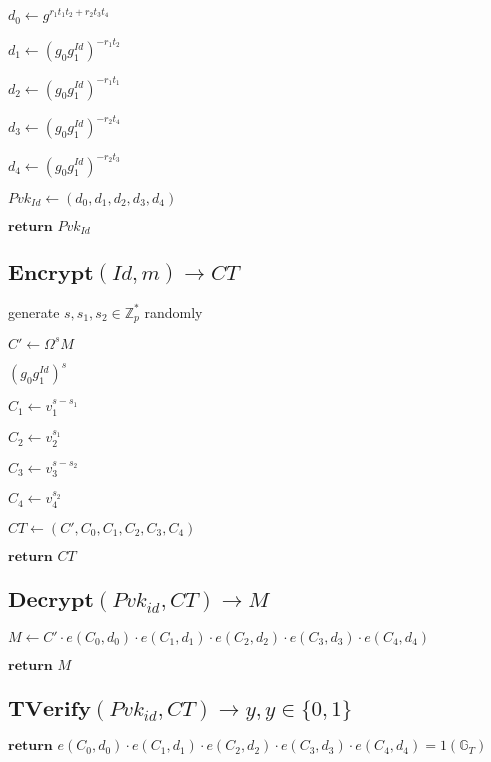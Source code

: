 \documentclass[a4paper]{article}
\begin{document}
$d_0 \gets g^{r_1 t_1 t_2 + r_2 t_3 t_4}$

$d_1 \gets (g_0 g_1^\textit{Id})^{-  r_1 t_2}$

$d_2 \gets (g_0 g_1^\textit{Id})^{-  r_1 t_1}$

$d_3 \gets (g_0 g_1^\textit{Id})^{-  r_2 t_4}$

$d_4 \gets (g_0 g_1^\textit{Id})^{-  r_2 t_3}$

$\textit{Pvk}_\textit{Id} \gets (d_0, d_1, d_2, d_3, d_4)$

$\textbf{return }\textit{Pvk}_\textit{Id}$

\subsection{$\textbf{Encrypt}(\textit{Id}, m) \rightarrow \textit{CT}$}

generate $s, s_1, s_2 \in \mathbb{Z}_p^*$ randomly

$C' \gets \Omega^s M$

$(g_0 g_1^\textit{Id})^s$

$C_1 \gets v_1^{s - s_1}$

$C_2 \gets v_2^{s_1}$

$C_3 \gets v_3^{s - s_2}$

$C_4 \gets v_4^{s_2}$

$\textit{CT} \gets (C', C_0, C_1, C_2, C_3, C_4)$

$\textbf{return }\textit{CT}$

\subsection{$\textbf{Decrypt}(\textit{Pvk}_\textit{id}, \textit{CT}) \rightarrow M$}

$M \gets C' \cdot e(C_0, d_0) \cdot e(C_1, d_1) \cdot e(C_2, d_2) \cdot e(C_3, d_3) \cdot e(C_4, d_4)$

$\textbf{return }M$

\subsection{$\textbf{TVerify}(\textit{Pvk}_\textit{id}, \textit{CT}) \rightarrow y, y \in \{0, 1\}$}

$\textbf{return }e(C_0, d_0) \cdot e(C_1, d_1) \cdot e(C_2, d_2) \cdot e(C_3, d_3) \cdot e(C_4, d_4) = 1 (\mathbb{G}_T)$
\end{document}
